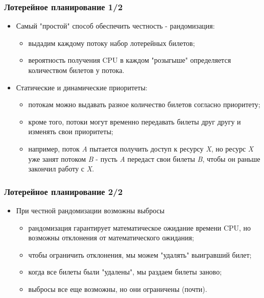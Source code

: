 \begin{frame}
\frametitle{Лотерейное планирование 1/2}
\begin{itemize}
  \item Самый "простой" способ обеспечить честность - рандомизация:
  \begin{itemize}
    \item выдадим каждому потоку набор лотерейных билетов;
    \item вероятность получения CPU в каждом "розыгыше" определяется количеством
    билетов у потока.
  \end{itemize}
  \item Статические и динамические приоритеты:
  \begin{itemize}
    \item потокам можно выдавать разное количество билетов согласно приоритету;
    \item кроме того, потоки могут временно передавать билеты друг другу и
    изменять свои приоритеты;
    \item например, поток \emph{A} пытается получить доступ к ресурсу \emph{X},
    но ресурс \emph{X} уже занят потоком \emph{B} - пусть \emph{A} передаст свои
    билеты \emph{B}, чтобы он раньше закончил работу с \emph{X}.
  \end{itemize}
\end{itemize}
\end{frame}

\begin{frame}
\frametitle{Лотерейное планирование 2/2}
\begin{itemize}
  \item При честной рандомизации возможны выбросы
  \begin{itemize}
    \item рандомизация гарантирует математическое ожидание времени CPU, но
    возможны отклонения от математического ожидания;
    \item чтобы ограничить отклонения, мы можем "удалять" выигравший билет;
    \item когда все билеты были "удалены", мы раздаем билеты заново;
    \item выбросы все еще возможны, но они ограничены (почти).
  \end{itemize}
\end{itemize}
\end{frame}
